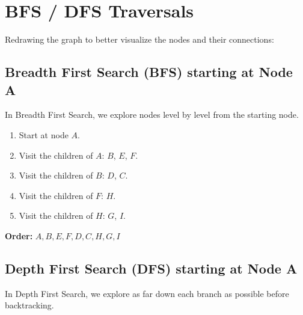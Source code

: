 \documentclass[10pt]{article}
\begin{document}
\section{BFS / DFS Traversals}
Redrawing the graph to better visualize the nodes and their connections:
\begin{center}
\end{center}

\subsection{Breadth First Search (BFS) starting at Node A}

In Breadth First Search, we explore nodes level by level from the starting node.

\begin{enumerate}
    \item Start at node \( A \).
    \item Visit the children of \( A \): \( B \), \( E \), \( F \).
    \item Visit the children of \( B \): \( D \), \( C \).
    \item Visit the children of \( F \): \( H \).
    \item Visit the children of \( H \): \( G \), \( I \).
\end{enumerate}

\textbf{Order:} \( A, B, E, F, D, C, H, G, I \)

\subsection{Depth First Search (DFS) starting at Node A}

In Depth First Search, we explore as far down each branch as possible before backtracking.
\end{document}

